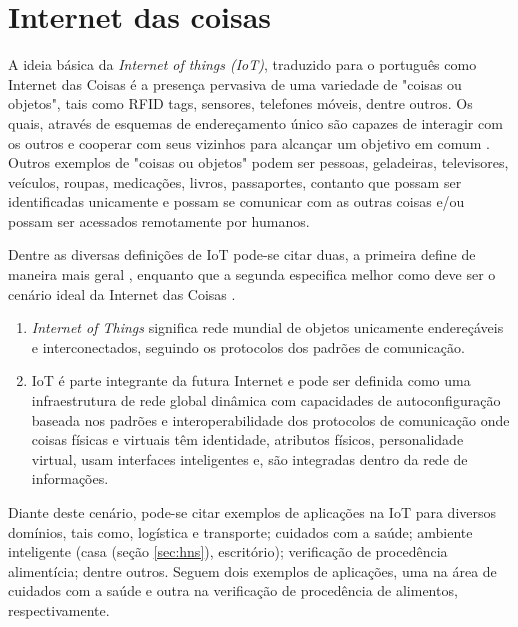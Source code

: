 ﻿\section{Internet das coisas}
\label{sec:iot}
A ideia básica da \textit{Internet of things (IoT)}, traduzido para o português como Internet das Coisas é a presença pervasiva de uma variedade de "coisas ou objetos", tais como RFID tags, sensores, telefones móveis, dentre outros. Os quais, através de esquemas de endereçamento único são capazes de interagir com os outros e cooperar com seus vizinhos para alcançar um objetivo em comum \cite{Atzori:2010}. Outros exemplos de "coisas ou objetos" podem ser pessoas, geladeiras, televisores, veículos, roupas, medicações, livros, passaportes, contanto que possam ser identificadas unicamente e possam se comunicar com as outras coisas e/ou possam ser acessados remotamente por humanos.

Dentre as diversas definições de IoT pode-se citar duas, a primeira define de maneira mais geral \cite{iot2020:2008}, enquanto que a segunda especifica melhor como deve ser o cenário ideal da Internet das Coisas \cite{Sundmaeker:2010}.
\begin{enumerate}
\item \textit{Internet of Things} significa rede mundial de objetos unicamente endereçáveis e interconectados, seguindo os protocolos dos padrões de comunicação.
\item IoT é parte integrante da futura Internet e pode ser definida como uma infraestrutura de rede global dinâmica com capacidades de autoconfiguração baseada nos padrões e interoperabilidade dos protocolos de comunicação onde coisas físicas e virtuais têm identidade, atributos físicos, personalidade virtual, usam interfaces inteligentes e, são integradas dentro da rede de informações.
\end{enumerate}

Diante deste cenário, pode-se citar exemplos de aplicações na IoT para diversos domínios, tais como, logística e transporte; cuidados com a saúde; ambiente inteligente (casa (seção \ref{sec:hns}), escritório); \cite{Atzori:2010} verificação de procedência alimentícia; dentre outros. Seguem dois exemplos de aplicações, uma na área de cuidados com a saúde e outra na verificação de procedência de alimentos, respectivamente.

